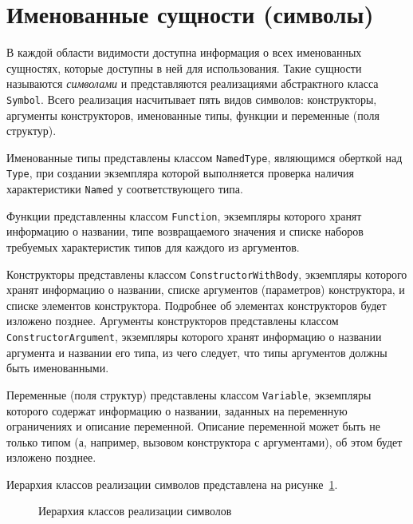 \documentclass[times,specification,annotation]{style/itmo-student-thesis/itmo-student-thesis}
\begin{document}
\section{Именованные сущности (символы)}

В каждой области видимости доступна информация о всех именованных сущностях, которые доступны в ней для использования. Такие сущности называются \textit{символами} и представляются реализациями абстрактного класса \texttt{Symbol}. Всего реализация насчитывает пять видов символов: конструкторы, аргументы конструкторов, именованные типы, функции и переменные (поля структур). 

Именованные типы представлены классом \texttt{NamedType}, являющимся оберткой над \texttt{Type}, при создании экземпляра которой выполняется проверка наличия характеристики \texttt{Named} у соответствующего типа.

Функции представленны классом \texttt{Function}, экземпляры которого хранят информацию о названии, типе возвращаемого значения и списке наборов требуемых характеристик типов для каждого из аргументов.

Конструкторы представлены классом \texttt{ConstructorWithBody}, экземпляры которого хранят информацию о названии, списке аргументов (параметров) конструктора, и списке элементов конструктора. Подробнее об элементах конструкторов будет изложено позднее. Аргументы конструкторов представлены классом \texttt{ConstructorArgument}, экземпляры которого хранят информацию о названии аргумента и названии его типа, из чего следует, что типы аргументов должны быть именованными.

Переменные (поля структур) представлены классом \texttt{Variable}, экземпляры которого содержат информацию о названии, заданных на переменную ограничениях и описание переменной. Описание переменной может быть не только типом (а, например, вызовом конструктора с аргументами), об этом будет изложено позднее.

Иерархия классов реализации символов представлена на рисунке~\ref{symbol-classes-hierarchy}.

\begin{figure}[!h]
\caption{Иерархия классов реализации символов}\label{symbol-classes-hierarchy}
\centering
{}
\end{figure}
\end{document}
